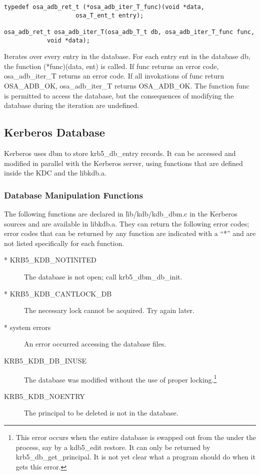 \begin{verbatim}
typedef osa_adb_ret_t (*osa_adb_iter_T_func)(void *data,
				    osa_T_ent_t entry);

osa_adb_ret_t osa_adb_iter_T(osa_adb_T_t db, osa_adb_iter_T_func func, 
		    void *data);
\end{verbatim}

Iterates over every entry in the database.  For each entry ent in the
database db, the function (*func)(data, ent) is called.  If func
returns an error code, osa_adb_iter_T returns an error code.  If all
invokations of func return OSA_ADB_OK, osa_adb_iter_T returns
OSA_ADB_OK.  The function func is permitted to access the database,
but the consequences of modifying the database during the iteration
are undefined.

\subsection{Kerberos Database}

Kerberos uses dbm to store krb5_db_entry records.  It can be accessed
and modified in parallel with the Kerberos server, using functions
that are defined inside the KDC and the libkdb.a.

\subsubsection{Database Manipulation Functions}

The following functions are declared in \v{lib/kdb/kdb_dbm.c} in the
Kerberos sources and are available in libkdb.a.  They can return the
following error codes; error codes that can be returned by any
function are indicated with a ``*'' and are not listed specifically
for each function.

\begin{description}
\item[* KRB5_KDB_NOTINITED] The database is not open; call
krb5_dbm_db_init.
\item[* KRB5_KDB_CANTLOCK_DB] The necessary lock cannot be acquired.  Try
again later.
\item[* system errors] An error occurred accessing the database files.
\item[KRB5_KDB_DB_INUSE] The database was modified without the use
of proper locking.\footnote{This error occurs when the entire database
is swapped out from the under the process, say by a kdb5_edit restore.
It can only be returned by krb5_db_get_principal.  It is not yet clear
what a program should do when it gets this error.}
\item[KRB5_KDB_NOENTRY] The principal to be deleted is not
in the database.
\end{description}

